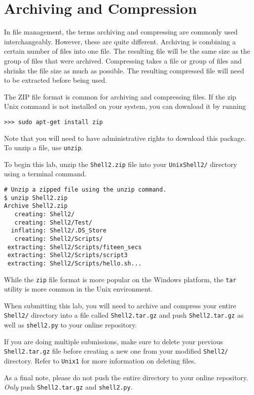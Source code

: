 

\section*{Archiving and Compression} %
In file management, the terms archiving and compressing are commonly used interchangeably.
However, these are quite different.
Archiving is combining a certain number of files into one file.
The resulting file will be the same size as the group of files that were archived. 
Compressing takes a file or group of files and shrinks the file size as much as possible. 
The resulting compressed file will need to be extracted before being used.

The ZIP file format is common for archiving and compressing files. 
If the zip Unix command is not installed on your system, you can download it by running 
\begin{lstlisting}
>>> sudo apt-get install zip
\end{lstlisting}
Note that you will need to have administrative rights to download this package. 
To unzip a file, use \texttt{unzip}.

\begin{info}
To begin this lab, unzip the \texttt{Shell2.zip} file into your \texttt{UnixShell2/} directory using a terminal command.
\end{info}

\begin{lstlisting}
# Unzip a zipped file using the unzip command.
$ unzip Shell2.zip
Archive Shell2.zip
   creating: Shell2/
   creating: Shell2/Test/
  inflating: Shell2/.DS_Store        
   creating: Shell2/Scripts/
 extracting: Shell2/Scripts/fiteen_secs  
 extracting: Shell2/Scripts/script3  
 extracting: Shell2/Scripts/hello.sh...
\end{lstlisting}

While the \texttt{zip} file format is more popular on the Windows platform, the \texttt{tar} utility is more
common in the Unix environment.

\begin{info}
When submitting this lab, you will need to archive and compress your entire \texttt{Shell2/} directory into a file called \texttt{Shell2.tar.gz} and push \texttt{Shell2.tar.gz} as well as \texttt{shell2.py} to your online repository.

If you are doing multiple submissions, make sure to delete your previous \texttt{Shell2.tar.gz} file before creating a new one from your modified \texttt{Shell2/} directory.
Refer to \texttt{Unix1} for more information on deleting files.

As a final note, please do not push the entire directory to your online repository.
\emph{Only} push \texttt{Shell2.tar.gz} and \texttt{shell2.py}.
\end{info}


